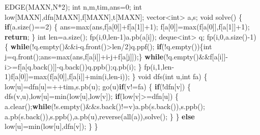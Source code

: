 \documentclass[
]{article}
\newenvironment{Shaded}{}{}
\newcommand{\ControlFlowTok}[1]{\textcolor[rgb]{0.00,0.44,0.13}{\textbf{#1}}}
\newcommand{\DataTypeTok}[1]{\textcolor[rgb]{0.56,0.13,0.00}{#1}}
\newcommand{\DecValTok}[1]{\textcolor[rgb]{0.25,0.63,0.44}{#1}}
\newcommand{\NormalTok}[1]{#1}
\begin{document}
\begin{Shaded}
\begin{Highlighting}[]
\NormalTok{EDGE(MAXN,N*}\DecValTok{2}\NormalTok{);}
\DataTypeTok{int}\NormalTok{ n,m,tim,ans=}\DecValTok{0}\NormalTok{;}
\DataTypeTok{int}\NormalTok{ low[MAXN],dfn[MAXN],f[MAXN],t[MAXN];}
\NormalTok{vector\textless{}}\DataTypeTok{int}\NormalTok{\textgreater{} a,s;}
\DataTypeTok{void}\NormalTok{ solve()}
\NormalTok{\{}
    \ControlFlowTok{if}\NormalTok{(a.size()==}\DecValTok{2}\NormalTok{)}
\NormalTok{    \{}
\NormalTok{        ans=max(ans,f[a[}\DecValTok{0}\NormalTok{]]+f[a[}\DecValTok{1}\NormalTok{]]+}\DecValTok{1}\NormalTok{);}
\NormalTok{        f[a[}\DecValTok{0}\NormalTok{]]=max(f[a[}\DecValTok{0}\NormalTok{]],f[a[}\DecValTok{1}\NormalTok{]]+}\DecValTok{1}\NormalTok{);}
        \ControlFlowTok{return}\NormalTok{;}
\NormalTok{    \}}
    \DataTypeTok{int}\NormalTok{ len=a.size();}
\NormalTok{    fp(i,}\DecValTok{0}\NormalTok{,len{-}}\DecValTok{1}\NormalTok{)a.pb(a[i]);}
\NormalTok{    deque\textless{}}\DataTypeTok{int}\NormalTok{\textgreater{} q;}
\NormalTok{    fp(i,}\DecValTok{0}\NormalTok{,a.size(){-}}\DecValTok{1}\NormalTok{)}
\NormalTok{    \{}
        \ControlFlowTok{while}\NormalTok{(!q.empty()\&\&i{-}q.front()\textgreater{}len/}\DecValTok{2}\NormalTok{)q.ppf();}
        \ControlFlowTok{if}\NormalTok{(!q.empty())\{}\DataTypeTok{int}\NormalTok{ j=q.front();ans=max(ans,f[a[i]]+i{-}j+f[a[j]]);\}}
        \ControlFlowTok{while}\NormalTok{(!q.empty()\&\&f[a[i]]{-}i\textgreater{}=f[a[q.back()]]{-}q.back())q.ppb();q.pb(i);}
\NormalTok{    \}}
\NormalTok{    fp(i,}\DecValTok{1}\NormalTok{,len{-}}\DecValTok{1}\NormalTok{)f[a[}\DecValTok{0}\NormalTok{]]=max(f[a[}\DecValTok{0}\NormalTok{]],f[a[i]]+min(i,len{-}i));}
\NormalTok{\}}
\DataTypeTok{void}\NormalTok{ dfs(}\DataTypeTok{int}\NormalTok{ u,}\DataTypeTok{int}\NormalTok{ fa)}
\NormalTok{\{}
\NormalTok{    low[u]=dfn[u]=++tim,s.pb(u);}
\NormalTok{    go(u)}\ControlFlowTok{if}\NormalTok{(v!=fa)}
\NormalTok{    \{}
        \ControlFlowTok{if}\NormalTok{(!dfn[v])}
\NormalTok{        \{}
\NormalTok{            dfs(v,u),low[u]=min(low[u],low[v]);}
            \ControlFlowTok{if}\NormalTok{(low[v]\textgreater{}=dfn[u])}
\NormalTok{            \{}
\NormalTok{                a.clear();}\ControlFlowTok{while}\NormalTok{(!s.empty()\&\&s.back()!=v)a.pb(s.back()),s.ppb();}
\NormalTok{                a.pb(s.back()),s.ppb(),a.pb(u),reverse(all(a)),solve();}
\NormalTok{            \}}
\NormalTok{        \}}
        \ControlFlowTok{else}\NormalTok{ low[u]=min(low[u],dfn[v]);}
\NormalTok{    \}}
\NormalTok{\}}

\end{Highlighting}
\end{Shaded}
\end{document}
